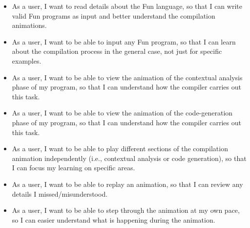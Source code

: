 \documentclass{l4proj}
\begin{document}
\begin{itemize}
\item As a user, I want to read details about the Fun language, so that I can write valid Fun programs as input and better understand the compilation animations.
\item As a user, I want to be able to input any Fun program, so that I can learn about the compilation process in the general case, not just for specific examples.
\item As a user, I want to be able to view the animation of the contextual analysis phase of my program, so that I can understand how the compiler carries out this task.
\item As a user, I want to be able to view the animation of the code-generation phase of my program, so that I can understand how the compiler carries out this task.
\item As a user, I want to be able to play different sections of the compilation animation independently (i.e., contextual analysis or code generation), so that I can focus my learning on specific areas. 
\item As a user, I want to be able to replay an animation, so that I can review any details I missed/misunderstood.
\item As a user, I want to be able to step through the animation at my own pace, so I can easier understand what is happening during the animation.
\end{itemize}
\end{document}
